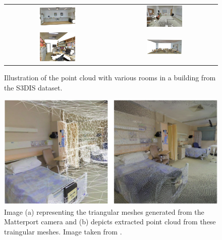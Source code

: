 \begin{figure}[!ht]
\begin{tabular}{cc}
        \includegraphics[width=0.35\textwidth, height=0.15\textheight]{images/seg_output/s3dis_DE/S3DIS_3_RGB.pdf} &
        \includegraphics[width=0.35\textwidth, height=0.15\textheight]{images/seg_output/s3dis_DE/S3DIS_7_RGB.pdf} \\

        \includegraphics[width=0.35\textwidth, height=0.15\textheight]{images/seg_output/s3dis_DE/S3DIS_4_RGB.pdf} &
        \includegraphics[width=0.35\textwidth, height=0.15\textheight]{images/seg_output/s3dis_DE/S3DIS_8_RGB.pdf} \\
    \end{tabular}
    \caption{Illustration of the point cloud with various rooms in a building from the S3DIS dataset.}
    \label{fig:s3dis_get_vis}
\end{figure}

\begin{figure}
    \centering
    \includegraphics[scale=0.35]{images/seg_output/s3dis_DE/matterport_scan.pdf}
    \caption{Image (a) representing the triangular meshes generated from the Matterport camera and (b) depicts extracted point cloud from these traingular meshes. Image taken from \cite{matterport_scan_generation}.}
    \label{fig:how_matterport_works}
\end{figure}
